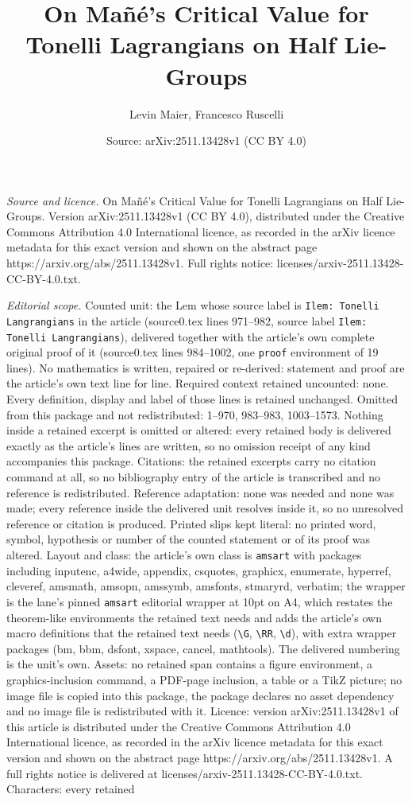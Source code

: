 \documentclass[10pt,a4paper]{amsart}
\title[On Ma\~n\'e's Critical Value for Tonelli Lagrangians on Half]{On Ma\~n\'e's Critical Value for Tonelli Lagrangians on Half Lie-Groups}
\author{Levin Maier, Francesco Ruscelli}
\date{Source: arXiv:2511.13428v1 (CC BY 4.0)}
\begin{document}
\maketitle

\noindent\emph{Source and licence.} On Ma\~n\'e's Critical Value for Tonelli Lagrangians on Half Lie-Groups. Version arXiv:2511.13428v1 (CC BY 4.0), distributed under the Creative Commons Attribution 4.0 International licence, as recorded in the arXiv licence metadata for this exact version and shown on the abstract page https://arxiv.org/abs/2511.13428v1. Full rights notice: licenses/arxiv-2511.13428-CC-BY-4.0.txt.\par\smallskip

\noindent\textit{Editorial scope.} Counted unit: the Lem whose source label is \texttt{Ilem: Tonelli Langrangians} in the article (source0.tex lines 971--982, source label \texttt{Ilem: Tonelli Langrangians}), delivered together with the article's own complete original proof of it (source0.tex lines 984--1002, one \texttt{proof} environment of 19 lines). No mathematics is written, repaired or re-derived: statement and proof are the article's own text line for line. Required context retained uncounted: none. Every definition, display and label of those lines is retained unchanged. Omitted from this package and not redistributed: 1--970, 983--983, 1003--1573. Nothing inside a retained excerpt is omitted or altered: every retained body is delivered exactly as the article's lines are written, so no omission receipt of any kind accompanies this package. Citations: the retained excerpts carry no citation command at all, so no bibliography entry of the article is transcribed and no reference is redistributed. Reference adaptation: none was needed and none was made; every reference inside the delivered unit resolves inside it, so no unresolved reference or citation is produced. Printed slips kept literal: no printed word, symbol, hypothesis or number of the counted statement or of its proof was altered. Layout and class: the article's own class is \texttt{amsart} with packages including inputenc, a4wide, appendix, csquotes, graphicx, enumerate, hyperref, cleveref, amsmath, amsopn, amssymb, amsfonts, stmaryrd, verbatim; the wrapper is the lane's pinned \texttt{amsart} editorial wrapper at 10pt on A4, which restates the theorem-like environments the retained text needs and adds the article's own macro definitions that the retained text needs (\texttt{\textbackslash G}, \texttt{\textbackslash RR}, \texttt{\textbackslash d}), with extra wrapper packages (bm, bbm, dsfont, xspace, cancel, mathtools). The delivered numbering is the unit's own. Assets: no retained span contains a figure environment, a graphics-inclusion command, a PDF-page inclusion, a table or a TikZ picture; no image file is copied into this package, the package declares no asset dependency and no image file is redistributed with it. Licence: version arXiv:2511.13428v1 of this article is distributed under the Creative Commons Attribution 4.0 International licence, as recorded in the arXiv licence metadata for this exact version and shown on the abstract page https://arxiv.org/abs/2511.13428v1. A full rights notice is delivered at licenses/arxiv-2511.13428-CC-BY-4.0.txt. Characters: every retained 
\end{document}
